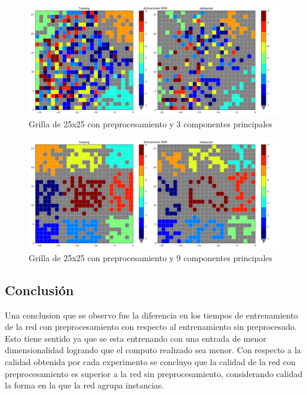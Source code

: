 \begin{figure}[H]
  \includegraphics[width=160mm]{imagenes/som_25_25_3_preprocess.png}
  \caption{Grilla de 25x25 con preprocesamiento y 3 componentes principales}
\end{figure}

\begin{figure}[H]
  \includegraphics[width=160mm]{imagenes/som_25_25_9_preprocess.png}
  \caption{Grilla de 25x25 con preprocesamiento y 9 componentes principales}
\end{figure}

\subsection{Conclusión}
Una conclusion que se observo fue la diferencia en los tiempos de entrenamiento de la red con preprocesamiento
con respecto al entrenamiento sin preprocesado. Esto tiene sentido ya que se esta entrenando con una entrada de menor
dimensionalidad logrando que el computo realizado sea menor. Con respecto a la calidad obtenida por cada experimento
se concluyo que la calidad de la red con preprocesamiento es superior a la red sin preprocesamiento, considerando calidad
la forma en la que la red agrupa instancias.

